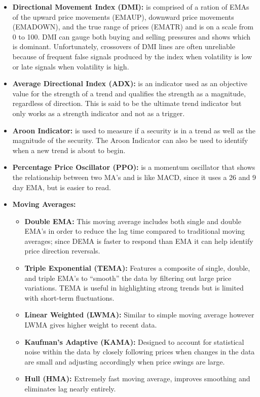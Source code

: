 \documentclass[11pt]{article}
\begin{document}
\begin{itemize}
\item \textbf{Directional Movement Index (DMI):} is comprised of a ration of EMAs of the upward price movements (EMAUP), downward price movements (EMADOWN), and the true range of prices (EMATR) and is on a scale from 0 to 100. DMI can gauge both buying and selling pressures and shows which is dominant. Unfortunately, crossovers of DMI lines are often unreliable because of frequent false signals produced by the index when volatility is low or late signals when volatility is high.
\item \textbf{Average Directional Index (ADX):} is an indicator used as an objective value for the strength of a trend and qualifies the strength as a magnitude, regardless of direction. This is said to be the ultimate trend indicator but only works as a strength indicator and not as a trigger.
\item \textbf{Aroon Indicator:} is used to measure if a security is in a trend as well as the magnitude of the security. The Aroon Indicator can also be used to identify when a new trend is about to begin.
\item \textbf{Percentage Price Oscillator (PPO):} is a momentum oscillator that shows the relationship between two MA’s and is like MACD, since it uses a 26 and 9 day EMA, but is easier to read.
\item \textbf{Moving Averages:}
	\begin{itemize}
		\item \textbf{Double EMA:} This moving average includes both single and double EMA’s in order to reduce the lag time compared to traditional moving averages; since DEMA is faster to respond than EMA it can help identify price direction reversals.
		\item \textbf{Triple Exponential (TEMA):} Features a composite of single, double, and triple EMA’s to “smooth” the data by filtering out large price variations. TEMA is useful in highlighting strong trends but is limited with short-term fluctuations.
		\item \textbf{Linear Weighted (LWMA):} Similar to simple moving average however LWMA gives higher weight to recent data.
		\item \textbf{Kaufman’s Adaptive (KAMA):} Designed to account for statistical noise within the data by closely following prices when changes in the data are small and adjusting accordingly when price swings are large.
		\item \textbf{Hull (HMA):} Extremely fast moving average, improves smoothing and eliminates lag nearly entirely.

\end{itemize}
\end{itemize}
\end{document}
